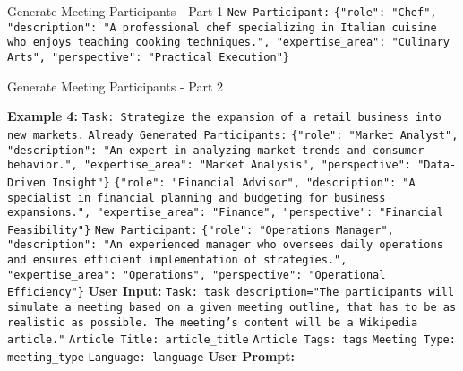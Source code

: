 \begin{figure*}[t]
\begin{AIbox}{Generate Meeting Participants - Part 1}
{        \texttt{New Participant:} \texttt{\{"role": "Chef", "description": "A professional chef specializing in Italian cuisine who enjoys teaching cooking techniques.", "expertise\_area": "Culinary Arts", "perspective": "Practical Execution"\}}
    }
    \end{AIbox}
    \caption{Prompt template for generating diverse, role-based meeting participants in structured JSON format (Part 1).}
    \label{fig:meeting_participants_prompt_p1}
\end{figure*}

\begin{figure*}[t]
    \begin{AIbox}{Generate Meeting Participants - Part 2}
    \parbox[t]{\textwidth}{
        \textbf{Example 4:}
        \texttt{Task: Strategize the expansion of a retail business into new markets.} \newline
        \texttt{Already Generated Participants:} \newline
        \texttt{\{"role": "Market Analyst", "description": "An expert in analyzing market trends and consumer behavior.", "expertise\_area": "Market Analysis", "perspective": "Data-Driven Insight"\}} \newline
        \texttt{\{"role": "Financial Advisor", "description": "A specialist in financial planning and budgeting for business expansions.", "expertise\_area": "Finance", "perspective": "Financial Feasibility"\}} \newline
        \texttt{New Participant:}
        \texttt{\{"role": "Operations Manager", "description": "An experienced manager who oversees daily operations and ensures efficient implementation of strategies.", "expertise\_area": "Operations", "perspective": "Operational Efficiency"\}} \newline
        \textbf{User Input:} \newline
        \texttt{Task: {task\_description="The participants will simulate a meeting based on a given meeting outline, that has to be as realistic as possible. The meeting's content will be a Wikipedia article."}} \newline
        \texttt{Article Title: {article\_title}} \newline
        \texttt{Article Tags: {tags}} \newline
        \texttt{Meeting Type: {meeting\_type}} \newline
        \texttt{Language: {language}} \newline
        \textbf{User Prompt:} \newline
}
\end{AIbox}
\end{figure*}

